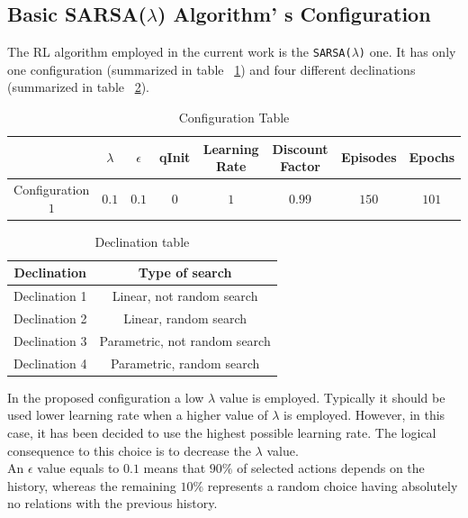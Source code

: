 \subsection{Basic SARSA($\lambda$) Algorithm' s Configuration} The RL algorithm employed in the current work is the {\tt SARSA($\lambda$)} one. It has only one configuration (summarized in table ~\ref{ConfigurationTable}) and four different declinations (summarized in table ~\ref{DeclinationTable}).

\begin{table} [h!]
	\centering
	\resizebox{\linewidth}{!} {	
	\begin{tabular}{|c||c|c|c|c|c|c|c|}
		\hline 
		& \textbf{$\lambda$}  & \textbf{$\epsilon$} & \textbf{qInit} & \textbf{Learning Rate} & \textbf{Discount Factor}  & \textbf{Episodes}  & \textbf{Epochs} \\
		\hline \hline Configuration $1$
		& $0.1$ & $0.1$ & $0$ & $1$ & $0.99$  & $150$ & $101$  \\ 
		\hline
	\end{tabular}
}
\caption{Configuration Table}
\label{ConfigurationTable}
\end{table}

\begin{table} [h!]
	\centering	
	\begin{tabular}{|c||c|}
		\hline \textbf{Declination}
		& \textbf{Type of search} \\ 
		\hline \hline Declination 1
		&  Linear, not random search\\ 
		\hline Declination 2
		& Linear, random search \\ 
		\hline Declination 3
		& Parametric, not random search \\ 
		\hline Declination 4
		&  Parametric, random search\\ 
		\hline 
	\end{tabular} 
\caption{Declination table}
\label{DeclinationTable}
\end{table}

In the proposed configuration a low $\lambda$ value is employed. Typically it should be used lower learning rate when a higher value of $\lambda$ is employed. However, in this case, it has been decided to use the highest possible learning rate. The logical consequence to this choice is to decrease the $\lambda$ value. \\

An $\epsilon$ value equals to $0.1$ means that $90\%$ of selected actions depends on the history, whereas the remaining $10\%$ represents a random choice having absolutely no relations with the previous history. \\ 

